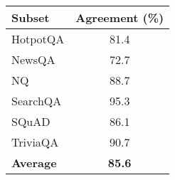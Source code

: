 
\centering
\begin{tabular}{l c}
\toprule
\textbf{Subset} & \textbf{Agreement (\%)} \\ \midrule
HotpotQA        & 81.4                        \\
NewsQA          & 72.7                        \\
NQ              & 88.7                        \\
SearchQA        & 95.3                        \\
SQuAD           & 86.1                        \\
TriviaQA        & 90.7                        \\ \midrule
\textbf{Average} & \textbf{85.6}            \\ \bottomrule
\end{tabular}
